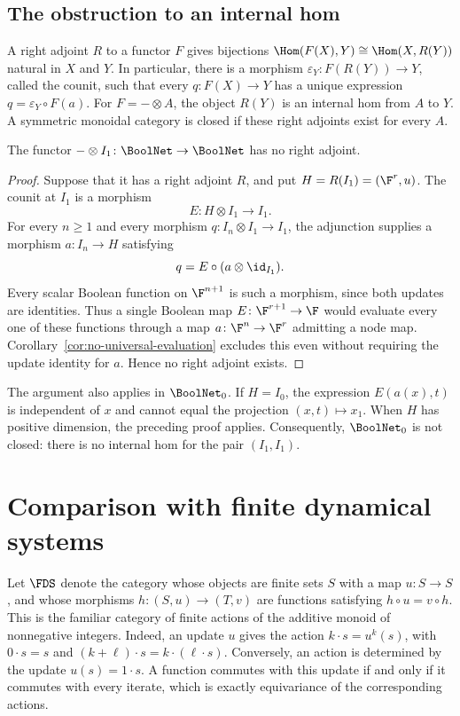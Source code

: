 \subsection{The obstruction to an internal hom}\label{subsec:category-internal-hom}

A right adjoint $R$ to a functor $F$ gives bijections $\Hom(F(X),Y)\cong\Hom(X,R(Y))$ natural in $X$ and $Y$. In particular, there is a morphism $\varepsilon_Y\colon F(R(Y))\to Y$, called the counit, such that every $q\colon F(X)\to Y$ has a unique expression $q=\varepsilon_Y\circ F(a)$. For $F=-\otimes A$, the object $R(Y)$ is an internal hom from $A$ to $Y$. A symmetric monoidal category is closed if these right adjoints exist for every $A$.

\begin{theorem}\label{thm:category-no-right-adjoint}
The functor $-\otimes I_1\colon\BoolNet\to\BoolNet$ has no right adjoint.
\end{theorem}

\begin{proof}
Suppose that it has a right adjoint $R$, and put $H=R(I_1)=(\F^r,u)$. The counit at $I_1$ is a morphism
\[
    E\colon H\otimes I_1\longrightarrow I_1.
\]
For every $n\geq1$ and every morphism $q\colon I_n\otimes I_1\to I_1$, the adjunction supplies a morphism $a\colon I_n\to H$ satisfying
\[
    q=E\circ(a\otimes\id_{I_1}).
\]
Every scalar Boolean function on $\F^{n+1}$ is such a morphism, since both updates are identities. Thus a single Boolean map $E\colon\F^{r+1}\to\F$ would evaluate every one of these functions through a map $a\colon\F^n\to\F^r$ admitting a node map. Corollary~\ref{cor:no-universal-evaluation} excludes this even without requiring the update identity for $a$. Hence no right adjoint exists.
\end{proof}

The argument also applies in $\BoolNet_0$. If $H=I_0$, the expression $E(a(x),t)$ is independent of $x$ and cannot equal the projection $(x,t)\mapsto x_1$. When $H$ has positive dimension, the preceding proof applies. Consequently, $\BoolNet_0$ is not closed: there is no internal hom for the pair $(I_1,I_1)$.

\section{Comparison with finite dynamical systems}\label{sec:category-comparison}

Let $\FDS$ denote the category whose objects are finite sets $S$ with a map $u\colon S\to S$, and whose morphisms $h\colon(S,u)\to(T,v)$ are functions satisfying $h\circ u=v\circ h$. This is the familiar category of finite actions of the additive monoid of nonnegative integers. Indeed, an update $u$ gives the action $k\cdot s=u^k(s)$, with $0\cdot s=s$ and $(k+\ell)\cdot s=k\cdot(\ell\cdot s)$. Conversely, an action is determined by the update $u(s)=1\cdot s$. A function commutes with this update if and only if it commutes with every iterate, which is exactly equivariance of the corresponding actions.


